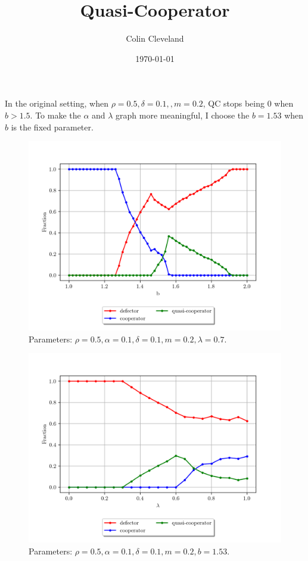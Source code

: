 \documentclass{article}
\title{Quasi-Cooperator }
\author{Colin Cleveland}
\date{\today}
\begin{document}
\maketitle

In the original setting, when $\rho = 0.5,  \delta = 0.1, ,m=0.2$, QC stops being 0 when $b > 1.5$. To make the $\alpha$ and $\lambda$ graph more meaningful, I choose the $b = 1.53$ when $b$ is the fixed parameter.


 \begin{figure}[h!t]
    \centering
    \includegraphics[width=\textwidth]{cg_B_200.png}
    \caption{Parameters: $ \rho = 0.5,\alpha =0.1,  \delta = 0.1, m=0.2, \lambda = 0.7$.}
    \label{fig:b200}
\end{figure}

\clearpage


 \begin{figure}[h!t]
    \centering
    \includegraphics[width=\textwidth]{cg_L_200.png}
    \caption{Parameters: $ \rho = 0.5,\alpha =0.1,  \delta = 0.1, m=0.2, b = 1.53$.}
    \label{fig:lambda200}
\end{figure}
\end{document}
